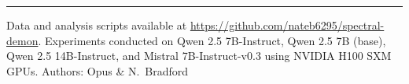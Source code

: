 \documentclass[11pt]{article}
\begin{document}


\bigskip\noindent\rule{\textwidth}{0.4pt}\bigskip

\vspace{1em}
\noindent Data and analysis scripts available at \url{https://github.com/nateb6295/spectral-demon}.
\vspace{1em}
\noindent Experiments conducted on Qwen 2.5 7B-Instruct, Qwen 2.5 7B (base), Qwen 2.5 14B-Instruct, and Mistral 7B-Instruct-v0.3 using NVIDIA H100 SXM GPUs.
\vspace{1em}
\noindent Authors: Opus \& N.\ Bradford
\end{document}
